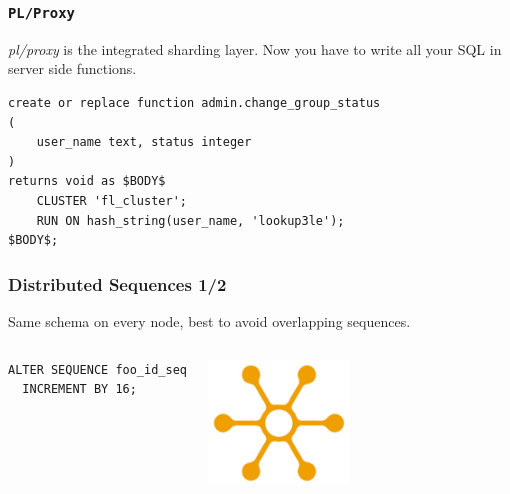 \documentclass[english]{beamer}
\begin{document}
\begin{frame}[fragile]
  \frametitle{\texttt{PL/Proxy}}

  \textit{pl/proxy} is the integrated sharding layer. Now you have to write
  all your SQL in server side functions.

  \begin{example}
\begin{verbatim}
create or replace function admin.change_group_status
(
    user_name text, status integer
)
returns void as $BODY$
    CLUSTER 'fl_cluster';
    RUN ON hash_string(user_name, 'lookup3le');
$BODY$;
\end{verbatim}
  \end{example}
\end{frame}

\begin{frame}[fragile]
  \frametitle{Distributed Sequences 1/2}

  Same schema on every node, best to avoid overlapping sequences.

\begin{columns}[c]

  \begin{example}
\begin{verbatim}
ALTER SEQUENCE foo_id_seq
  INCREMENT BY 16;
\end{verbatim}
  \end{example}

\includegraphics[height=9em]{distribution.jpg}
\end{columns}
\end{frame}
\end{document}

